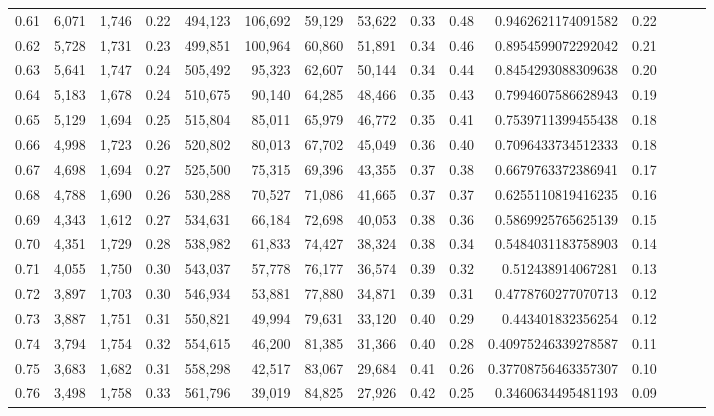 \begin{tabular}{rrrrrrrrrrrrrrr}
0.61 &   6,071 &  1,746 &  0.22 &  494,123 &  106,692 &   59,129 &   53,622 &  0.33 &  0.48 &     0.9462621174091582 &      0.22 \\
0.62 &   5,728 &  1,731 &  0.23 &  499,851 &  100,964 &   60,860 &   51,891 &  0.34 &  0.46 &     0.8954599072292042 &      0.21 \\
0.63 &   5,641 &  1,747 &  0.24 &  505,492 &   95,323 &   62,607 &   50,144 &  0.34 &  0.44 &     0.8454293088309638 &      0.20 \\
0.64 &   5,183 &  1,678 &  0.24 &  510,675 &   90,140 &   64,285 &   48,466 &  0.35 &  0.43 &     0.7994607586628943 &      0.19 \\
0.65 &   5,129 &  1,694 &  0.25 &  515,804 &   85,011 &   65,979 &   46,772 &  0.35 &  0.41 &     0.7539711399455438 &      0.18 \\
0.66 &   4,998 &  1,723 &  0.26 &  520,802 &   80,013 &   67,702 &   45,049 &  0.36 &  0.40 &     0.7096433734512333 &      0.18 \\
0.67 &   4,698 &  1,694 &  0.27 &  525,500 &   75,315 &   69,396 &   43,355 &  0.37 &  0.38 &     0.6679763372386941 &      0.17 \\
0.68 &   4,788 &  1,690 &  0.26 &  530,288 &   70,527 &   71,086 &   41,665 &  0.37 &  0.37 &     0.6255110819416235 &      0.16 \\
0.69 &   4,343 &  1,612 &  0.27 &  534,631 &   66,184 &   72,698 &   40,053 &  0.38 &  0.36 &     0.5869925765625139 &      0.15 \\
0.70 &   4,351 &  1,729 &  0.28 &  538,982 &   61,833 &   74,427 &   38,324 &  0.38 &  0.34 &     0.5484031183758903 &      0.14 \\
0.71 &   4,055 &  1,750 &  0.30 &  543,037 &   57,778 &   76,177 &   36,574 &  0.39 &  0.32 &      0.512438914067281 &      0.13 \\
0.72 &   3,897 &  1,703 &  0.30 &  546,934 &   53,881 &   77,880 &   34,871 &  0.39 &  0.31 &     0.4778760277070713 &      0.12 \\
0.73 &   3,887 &  1,751 &  0.31 &  550,821 &   49,994 &   79,631 &   33,120 &  0.40 &  0.29 &      0.443401832356254 &      0.12 \\
0.74 &   3,794 &  1,754 &  0.32 &  554,615 &   46,200 &   81,385 &   31,366 &  0.40 &  0.28 &    0.40975246339278587 &      0.11 \\
0.75 &   3,683 &  1,682 &  0.31 &  558,298 &   42,517 &   83,067 &   29,684 &  0.41 &  0.26 &    0.37708756463357307 &      0.10 \\
0.76 &   3,498 &  1,758 &  0.33 &  561,796 &   39,019 &   84,825 &   27,926 &  0.42 &  0.25 &     0.3460634495481193 &      0.09 \\

\end{tabular}
